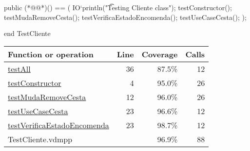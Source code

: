 \begin{vdmpp}[breaklines=true]
  public (*@@*)() == (
    IO`println("\t Testing Cliente class");
    testConstructor();
    testMudaRemoveCesta();
    testVerificaEstadoEncomenda();
    testUseCaseCesta();
  );

end TestCliente
\end{vdmpp}
\bigskip
\begin{longtable}{|l|r|r|r|}
\hline
Function or operation & Line & Coverage & Calls \\
\hline
\hline
\hyperref[testAll:36]{testAll} & 36&87.5\% & 12 \\
\hline
\hyperref[testConstructor:4]{testConstructor} & 4&95.0\% & 26 \\
\hline
\hyperref[testMudaRemoveCesta:12]{testMudaRemoveCesta} & 12&96.0\% & 26 \\
\hline
\hyperref[testUseCaseCesta:23]{testUseCaseCesta} & 23&96.6\% & 12 \\
\hline
\hyperref[testVerificaEstadoEncomenda:23]{testVerificaEstadoEncomenda} & 23&98.7\% & 12 \\
\hline
\hline
TestCliente.vdmpp & & 96.9\% & 88 \\
\hline
\end{longtable}

